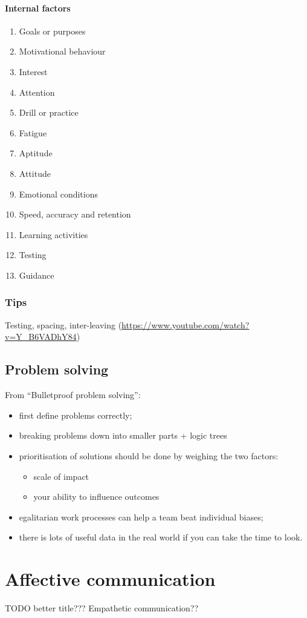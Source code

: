 \documentclass{report}
\begin{document}
\subsection{Internal factors}
\begin{enumerate}
\item Goals or purposes
\item Motivational behaviour
\item Interest
\item Attention
\item Drill or practice
\item Fatigue
\item Aptitude
\item Attitude
\item Emotional conditions
\item Speed, accuracy and retention
\item Learning activities
\item Testing
\item Guidance
\end{enumerate}
\section{Tips}
Testing, spacing, inter-leaving (\url{https://www.youtube.com/watch?v=Y_B6VADhY84})

\chapter{Problem solving}
From ``Bulletproof problem solving'':
\begin{itemize}
\item first define problems correctly;
\item breaking problems down into smaller parts + logic trees
\item prioritisation of solutions should be done by weighing the two factors:
\begin{itemize}
\item scale of impact
\item your ability to influence outcomes
\end{itemize}
\item egalitarian work processes can help a team beat individual biases;
\item there is lots of useful data in the real world if you can take the time to look.
\end{itemize}

\part{Affective communication}
TODO better title??? Empathetic communication??
\setcounter{chapter}{0} %
\end{document}
